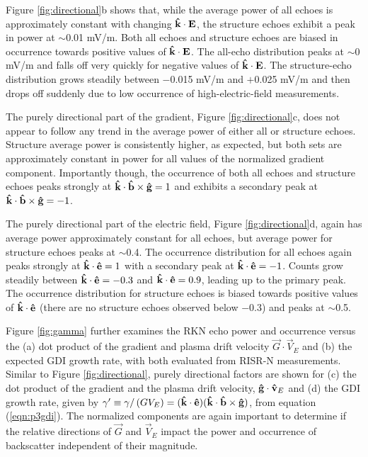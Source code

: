 Figure \ref{fig:directional}b shows that, while the average power of all echoes is approximately constant with changing \(\mathbf{\hat{k}}\cdot\mathbf{E}\), the structure echoes exhibit a peak in power at \(\sim\)0.01 mV/m.
Both all echoes and structure echoes are biased in occurrence towards positive values of \(\mathbf{\hat{k}}\cdot\mathbf{E}\). The all-echo distribution peaks at \(\sim\)0 mV/m and falls off very quickly for negative values of \(\mathbf{\hat{k}}\cdot\mathbf{E}\). The structure-echo distribution grows steadily between $-$0.015 mV/m and $+$0.025 mV/m and then drops off suddenly due to low occurrence of high-electric-field measurements.

The purely directional part of the gradient, Figure \ref{fig:directional}c, does not appear to follow any trend in the average power of either all or structure echoes.  Structure average power is consistently higher, as expected, but both sets are approximately constant in power for all values of the normalized gradient component.  Importantly though, the occurrence of both all echoes and structure echoes peaks strongly at \(\mathbf{\hat{k}}\cdot\mathbf{\hat{b}}\times\mathbf{\hat{g}} = 1\) and exhibits a secondary peak at \(\mathbf{\hat{k}}\cdot\mathbf{\hat{b}}\times\mathbf{\hat{g}} = -1\).

The purely directional part of the electric field, Figure \ref{fig:directional}d, again has average power approximately constant for all echoes, but average power for structure echoes peaks at \(\sim\)0.4.  The occurrence distribution for all echoes again peaks strongly at \(\mathbf{\hat{k}}\cdot\mathbf{\hat{e}} = 1\) with a secondary peak at \(\mathbf{\hat{k}}\cdot\mathbf{\hat{e}} = -1\). Counts grow steadily between \(\mathbf{\hat{k}}\cdot\mathbf{\hat{e}} = -0.3\) and \(\mathbf{\hat{k}}\cdot\mathbf{\hat{e}} = 0.9\), leading up to the primary peak.  The occurrence distribution for structure echoes is biased towards positive values of \(\mathbf{\hat{k}}\cdot\mathbf{\hat{e}}\) (there are no structure echoes observed below $-$0.3) and peaks at \(\sim\)0.5.

Figure \ref{fig:gamma} further examines the RKN echo power and occurrence versus the (a) dot product of the gradient and plasma drift velocity \(\vec{G}\cdot\vec{V}_E\) and (b) the expected GDI growth rate, with both evaluated from RISR-N measurements.  Similar to Figure \ref{fig:directional}, purely directional factors are shown for (c) the dot product of the gradient and the plasma drift velocity, \(\mathbf{\hat{g}}\cdot\mathbf{\hat{v}}_E\)  and (d) the GDI growth rate, given by \(\gamma^\prime \equiv \gamma/\left(GV_E\right) = (\mathbf{\hat{k}}\cdot\mathbf{\hat{e}})(\mathbf{\hat{k}}\cdot\mathbf{\hat{b}}\times\mathbf{\hat{g}})\), from equation (\ref{eqn:p3gdi}).  The normalized components are again important to determine if the relative directions of \(\vec{G}\) and \(\vec{V}_E\) impact the power and occurrence of backscatter independent of their magnitude.


